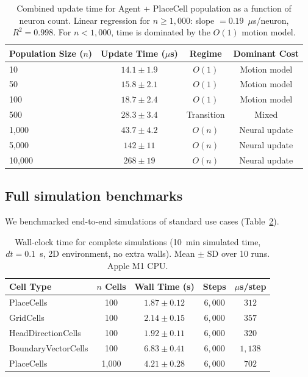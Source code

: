\documentclass[11pt]{article}
\begin{document}
\begin{table}[H]
\centering
\caption{Combined update time for Agent + PlaceCell population as a function of neuron count. Linear regression for $n \geq 1{,}000$: slope $= 0.19$~$\mu$s/neuron, $R^{2} = 0.998$. For $n < 1{,}000$, time is dominated by the $O(1)$ motion model.}
\label{tab:scaling}
\begin{tabular}{lccc}
\toprule
\textbf{Population Size ($n$)} & \textbf{Update Time ($\mu$s)} & \textbf{Regime} & \textbf{Dominant Cost} \\
\midrule
10 & $14.1 \pm 1.9$ & $O(1)$ & Motion model \\
50 & $15.8 \pm 2.1$ & $O(1)$ & Motion model \\
100 & $18.7 \pm 2.4$ & $O(1)$ & Motion model \\
500 & $28.3 \pm 3.4$ & Transition & Mixed \\
1{,}000 & $43.7 \pm 4.2$ & $O(n)$ & Neural update \\
5{,}000 & $142 \pm 11$ & $O(n)$ & Neural update \\
10{,}000 & $268 \pm 19$ & $O(n)$ & Neural update \\
\bottomrule
\end{tabular}
\end{table}

\subsection{Full simulation benchmarks}

We benchmarked end-to-end simulations of standard use cases (Table~\ref{tab:full_sim}).

\begin{table}[H]
\centering
\caption{Wall-clock time for complete simulations (10~min simulated time, $dt = 0.1$~s, 2D environment, no extra walls). Mean $\pm$ SD over 10 runs. Apple M1 CPU.}
\label{tab:full_sim}
\begin{tabular}{lcccc}
\toprule
\textbf{Cell Type} & \textbf{$n$ Cells} & \textbf{Wall Time (s)} & \textbf{Steps} & \textbf{$\mu$s/step} \\
\midrule
PlaceCells & 100 & $1.87 \pm 0.12$ & $6{,}000$ & $312$ \\
GridCells & 100 & $2.14 \pm 0.15$ & $6{,}000$ & $357$ \\
HeadDirectionCells & 100 & $1.92 \pm 0.11$ & $6{,}000$ & $320$ \\
BoundaryVectorCells & 100 & $6.83 \pm 0.41$ & $6{,}000$ & $1{,}138$ \\
PlaceCells & 1{,}000 & $4.21 \pm 0.28$ & $6{,}000$ & $702$ \\
\bottomrule
\end{tabular}
\end{table}
\end{document}
